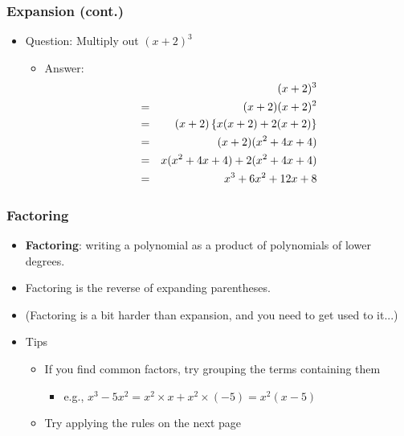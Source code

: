 \documentclass[pdflatex, 12pt]{beamer}
\begin{document}
\begin{frame}
\frametitle{Expansion (cont.)}
\begin{itemize}
\item Question: Multiply out $(x + 2)^3$
\vspace{0.4cm}
 \begin{itemize}
 \item Answer:
 \begin{eqnarray}
 && (x + 2)^3 \notag \\
 &=& (x + 2)(x + 2)^2 \notag \\
 &=& (x + 2)\left\{x(x + 2) + 2(x + 2)\right\} \notag \\
 &=& (x + 2)(x^2 + 4x + 4) \notag \\
 &=& x(x^2 + 4x + 4) + 2(x^2 + 4x + 4) \notag \\
 &=& x^3 + 6x^2 + 12x + 8 \notag
 \end{eqnarray}
 \end{itemize}
\end{itemize}
\end{frame}

\begin{frame}
\frametitle{Factoring}
\begin{itemize}
\item \textbf{Factoring}: writing a polynomial as a product of polynomials of lower degrees.
\vspace{0.4cm}
\item Factoring is the reverse of expanding parentheses.
\vspace{0.4cm}
\item (Factoring is a bit harder than expansion, and you need to get used to it...)
\vspace{0.4cm}
\item Tips
 \begin{itemize}
 \item If you find common factors, try grouping the terms containing them
  \begin{itemize}
  \item e.g., $x^3 - 5x^2 = x^2 \times x + x^2 \times (-5) = x^2(x - 5)$
  \end{itemize}
 \item Try applying the rules on the next page
 \end{itemize}
\end{itemize}
\end{frame}
\end{document}
